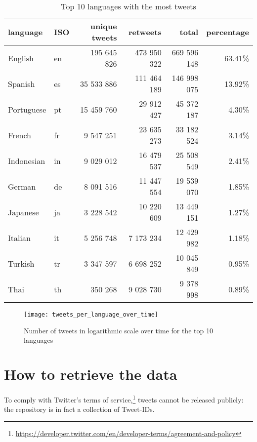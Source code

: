 \begin{table}[H]
    \centering
    \begin{tabularx}{\columnwidth}{@{}XXrrrr@{}}
    		\bottomrule
    		\textbf{language} & \textbf{ISO} & \textbf{unique tweets} & \textbf{retweets} & \textbf{total} & \textbf{percentage} \\
    		\midrule
        English & en & 195 645 826 & 473 950 322 & 669 596 148 & 63.41\% 
        \\
		Spanish & es & 35 533 886 & 111 464 189 & 146 998 075 & 13.92\% 
		\\
		Portuguese & pt & 15 459 760 & 29 912 427 & 45 372 187 & 4.30\% 
		\\
		French & fr & 9 547 251 & 23 635 273 & 33 182 524 & 3.14\% 
		\\
		Indonesian & in & 9 029 012 & 16 479 537 & 25 508 549 & 2.41\%
		\\
		German & de & 8 091 516 & 11 447 554 & 19 539 070 & 1.85\%
		\\
		Japanese & ja & 3 228 542 & 10 220 609 & 13 449 151 & 1.27\%
		\\
		Italian & it & 5 256 748 & 7 173 234 & 12 429 982 & 1.18\%
		\\
		Turkish & tr & 3 347 597 & 6 698 252 & 10 045 849 & 0.95\%
		\\
		Thai & th & 350 268 & 9 028 730 & 9 378 998 & 0.89\%
		\\
		\bottomrule
    \end{tabularx}
    \caption{Top 10 languages with the most tweets}
    \label{tab:dataset-language-stats}
\end{table}

\begin{figure}[H]
	\centering
    	\texttt{[image: tweets\_per\_language\_over\_time]}
    	\caption{Number of tweets in logarithmic scale over time for the top 10 languages}
    	\label{fig:tweets-language-over-time}
\end{figure}

\section{How to retrieve the data}
\label{sec:retrieve-data}

To comply with Twitter's terms of service,\footnote{\url{https://developer.twitter.com/en/developer-terms/agreement-and-policy}} tweets cannot be released publicly: the repository is in fact a collection of Tweet-IDs.

